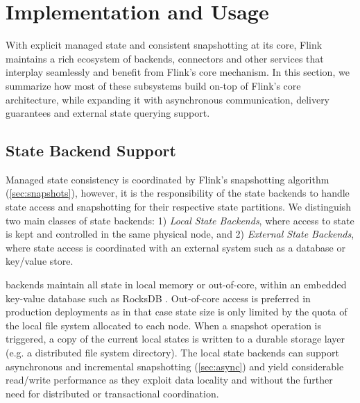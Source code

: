 

\section{Implementation and Usage}

With explicit managed state and consistent snapshotting at its core, Flink maintains a rich ecosystem of backends, connectors and other services that interplay seamlessly and benefit from Flink's core mechanism. In this section, we summarize how most of these subsystems build on-top of Flink's core architecture, while expanding it with asynchronous communication, delivery guarantees and external state querying support.

\label{sec:implementation}

\subsection{State Backend Support}

Managed state consistency is coordinated by Flink's snapshotting algorithm (\autoref{sec:snapshots}), however, it is the responsibility of the state backends to handle state access and snapshotting for their respective state partitions. We distinguish two main classes of state backends: 1) \emph{Local State Backends}, where access to state is kept and controlled in the same physical node, and 2) \emph{External State Backends}, where state access is coordinated with an external system such as a database or key/value store.

 backends maintain all state in local memory or out-of-core, within an embedded key-value database such as RocksDB \cite{CUSTOM:web/rocksdb}. Out-of-core access is preferred in production deployments as in that case state size is only limited by the quota of the local file system allocated to each node. When a snapshot operation is triggered, a copy of the current local states is written to a durable storage layer (e.g. a distributed file system directory). The local state backends can support asynchronous and incremental snapshotting (\autoref{sec:async}) and yield considerable read/write performance as they exploit data locality and  without the further need for distributed or transactional coordination.

